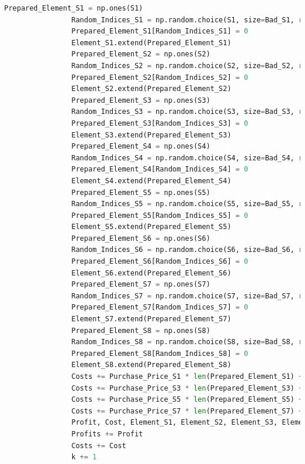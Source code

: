 \documentclass[withoutpreface,bwprint]{cumcmthesis} %
\begin{document}
\begin{appendices}
\begin{lstlisting}[language=python]
				Prepared_Element_S1 = np.ones(S1)
				Random_Indices_S1 = np.random.choice(S1, size=Bad_S1, replace=False)
				Prepared_Element_S1[Random_Indices_S1] = 0
				Element_S1.extend(Prepared_Element_S1)
				Prepared_Element_S2 = np.ones(S2)
				Random_Indices_S2 = np.random.choice(S2, size=Bad_S2, replace=False)
				Prepared_Element_S2[Random_Indices_S2] = 0
				Element_S2.extend(Prepared_Element_S2)
				Prepared_Element_S3 = np.ones(S3)
				Random_Indices_S3 = np.random.choice(S3, size=Bad_S3, replace=False)
				Prepared_Element_S3[Random_Indices_S3] = 0
				Element_S3.extend(Prepared_Element_S3)
				Prepared_Element_S4 = np.ones(S4)
				Random_Indices_S4 = np.random.choice(S4, size=Bad_S4, replace=False)
				Prepared_Element_S4[Random_Indices_S4] = 0
				Element_S4.extend(Prepared_Element_S4)
				Prepared_Element_S5 = np.ones(S5)
				Random_Indices_S5 = np.random.choice(S5, size=Bad_S5, replace=False)
				Prepared_Element_S5[Random_Indices_S5] = 0
				Element_S5.extend(Prepared_Element_S5)
				Prepared_Element_S6 = np.ones(S6)
				Random_Indices_S6 = np.random.choice(S6, size=Bad_S6, replace=False)
				Prepared_Element_S6[Random_Indices_S6] = 0
				Element_S6.extend(Prepared_Element_S6)
				Prepared_Element_S7 = np.ones(S7)
				Random_Indices_S7 = np.random.choice(S7, size=Bad_S7, replace=False)
				Prepared_Element_S7[Random_Indices_S7] = 0
				Element_S7.extend(Prepared_Element_S7)
				Prepared_Element_S8 = np.ones(S8)
				Random_Indices_S8 = np.random.choice(S8, size=Bad_S8, replace=False)
				Prepared_Element_S8[Random_Indices_S8] = 0
				Element_S8.extend(Prepared_Element_S8)
				Costs += Purchase_Price_S1 * len(Prepared_Element_S1) + Purchase_Price_S2 * len(Prepared_Element_S2)
				Costs += Purchase_Price_S3 * len(Prepared_Element_S3) + Purchase_Price_S4 * len(Prepared_Element_S4)
				Costs += Purchase_Price_S5 * len(Prepared_Element_S5) + Purchase_Price_S6 * len(Prepared_Element_S6)
				Costs += Purchase_Price_S7 * len(Prepared_Element_S7) + Purchase_Price_S8 * len(Prepared_Element_S8)
				Profit, Cost, Element_S1, Element_S2, Element_S3, Element_S4, Element_S5, Element_S6, Element_S7, Element_S8, Semi_Finished_Product_S1, Semi_Finished_Product_S2, Semi_Finished_Product_S3, Semi_Finished_Product_S1_Form, Semi_Finished_Product_S2_Form, Semi_Finished_Product_S3_Form, Exchange_Quantity = Solve(Element_S1, Element_S2, Element_S3, Element_S4, Element_S5, Element_S6, Element_S7, Element_S8, Semi_Finished_Product_S1, Semi_Finished_Product_S2, Semi_Finished_Product_S3, Semi_Finished_Product_S1_Form, Semi_Finished_Product_S2_Form, Semi_Finished_Product_S3_Form, Decision_Vector, Exchange_Quantity)
				Profits += Profit
				Costs += Cost
				k += 1
	

\end{lstlisting}
\end{appendices}
\end{document}

